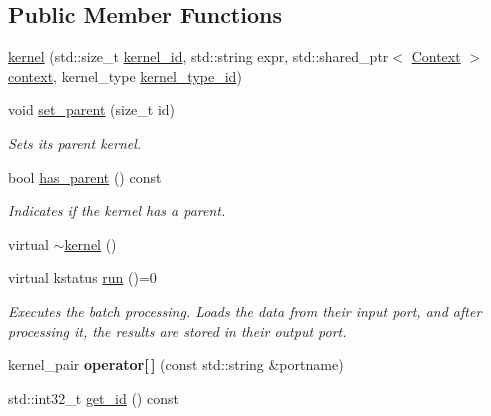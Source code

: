 \subsection*{Public Member Functions}
\begin{DoxyCompactItemize}
\item 
\hyperlink{classral_1_1cache_1_1kernel_a533e4ae37fc18a6c8638f30ee8459d8f}{kernel} (std\+::size\+\_\+t \hyperlink{classral_1_1cache_1_1kernel_a2fd708656cb056a41ec635b8bdc4acfe}{kernel\+\_\+id}, std\+::string expr, std\+::shared\+\_\+ptr$<$ \hyperlink{classblazingdb_1_1manager_1_1Context}{Context} $>$ \hyperlink{classral_1_1cache_1_1kernel_af0347d14d678cfa7205c1387746a2e1b}{context}, kernel\+\_\+type \hyperlink{classral_1_1cache_1_1kernel_a923841bcb8d995048c58d51a6c39caf7}{kernel\+\_\+type\+\_\+id})
\item 
void \hyperlink{classral_1_1cache_1_1kernel_a150ae499b8aef4669714e791f2bea9e9}{set\+\_\+parent} (size\+\_\+t id)
\begin{DoxyCompactList}\small\item\em Sets its parent kernel. \end{DoxyCompactList}\item 
bool \hyperlink{classral_1_1cache_1_1kernel_a21dc72f0714ddc2b4b2187592d05ba77}{has\+\_\+parent} () const
\begin{DoxyCompactList}\small\item\em Indicates if the kernel has a parent. \end{DoxyCompactList}\item 
virtual \hyperlink{classral_1_1cache_1_1kernel_a08658078acd31ec27af290f6712fa017}{$\sim$kernel} ()
\item 
virtual kstatus \hyperlink{classral_1_1cache_1_1kernel_a735b081cccae9574924e74ea6d293ef7}{run} ()=0
\begin{DoxyCompactList}\small\item\em Executes the batch processing. Loads the data from their input port, and after processing it, the results are stored in their output port. \end{DoxyCompactList}\item 
\mbox{\label{classral_1_1cache_1_1kernel_abb0b2c6bdc9e3379cc675e57270b207b}} 
kernel\+\_\+pair {\bfseries operator\mbox{[}$\,$\mbox{]}} (const std\+::string \&portname)
\item 
std\+::int32\+\_\+t \hyperlink{classral_1_1cache_1_1kernel_a33ce6e9907abce1acedb01e236c6812e}{get\+\_\+id} () const

\end{DoxyCompactItemize}

